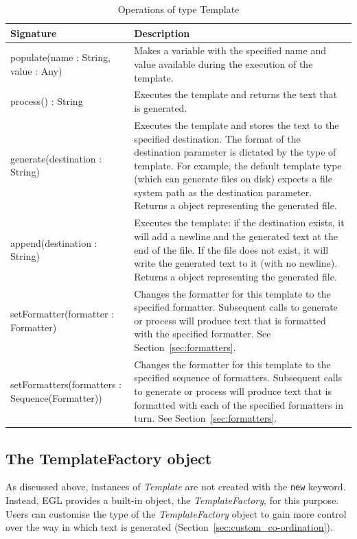 \begin{longtabu} {|p{5.5cm}|X|}
			
			\caption{Operations of type Template}
			\label{tab:TemplateOperations}\\
			
			\hline
							
			\textbf{Signature} & \textbf{Description} \\\hline
			
			populate(name : String, value : Any) & Makes a variable with the specified name and value available during the execution of the template. \\\hline
			
			process() : String & Executes the template and returns the text that is generated.  \\\hline

			generate(destination : String) & Executes the template and stores the text to the specified destination. The format of the destination parameter is dictated by the type of template. For example, the default template type (which can generate files on disk) expects a file system path as the destination parameter. Returns a  object representing the generated file.\\\hline

      append(destination : String) & Executes the template: if the destination exists, it will add a newline and the generated text at the end of the file. If the file does not exist, it will write the generated text to it (with no newline). Returns a  object representing the generated file.\\\hline

			setFormatter(formatter : Formatter) & Changes the formatter for this template to the specified formatter. Subsequent calls to generate or process will produce text that is formatted with the specified formatter. See Section~\ref{sec:formatters}. \\\hline
			
			setFormatters(formatters : Sequence(Formatter)) & Changes the formatter for this template to the specified sequence of formatters. Subsequent calls to generate or process will produce text that is formatted with each of the specified formatters in turn. See Section~\ref{sec:formatters}. \\\hline
\end{longtabu}


\subsection{The TemplateFactory object}
As discussed above, instances of \emph{Template} are not created with the \texttt{new} keyword. Instead, EGL provides a built-in object, the \emph{TemplateFactory}, for this purpose. Users can customise the type of the \emph{TemplateFactory} object to gain more control over the way in which text is generated (Section~\ref{sec:custom_co-ordination}).

